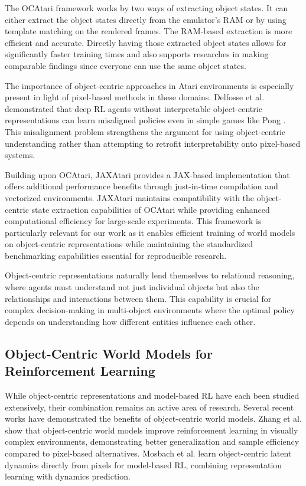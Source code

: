 \documentclass[
	english,
	ruledheaders=section,
	class=report,
	thesis={type=master},
	accentcolor=9c,
	custommargins=true,
	marginpar=false,
	parskip=half-,
	fontsize=11pt,
	pdfa=true,
]{tudapub}
\newcommand{\worldmodel}{world model}
\begin{document}
The OCAtari framework works by two ways of extracting object states. It can
either extract the object states directly from the emulator's RAM or by using
template matching on the rendered frames. The RAM-based extraction is more
efficient and accurate. Directly having those extracted object states allows
for significantly faster training times and also supports researches in making
comparable findings since everyone can use the same object states.

The importance of object-centric approaches in Atari environments is especially
present in light of pixel-based methods in these domains. Delfosse et al.
demonstrated that deep RL agents without interpretable object-centric
representations can learn misaligned policies even in simple games like Pong
\cite{DBLP:conf/rlc/DelfosseBGSK24}. This misalignment problem strengthens the argument
for using object-centric understanding rather than attempting to retrofit
interpretability onto pixel-based systems.

Building upon OCAtari, JAXAtari \cite{jaxatari} provides a
JAX-based implementation that offers additional performance benefits through
just-in-time compilation and vectorized environments. JAXAtari maintains
compatibility with the object-centric state extraction capabilities of OCAtari
while providing enhanced computational efficiency for large-scale experiments.
This framework is particularly relevant for our work as it enables efficient
training of \worldmodel{}s on object-centric representations while maintaining
the standardized benchmarking capabilities essential for reproducible research.

Object-centric representations naturally lend themselves to relational
reasoning, where agents must understand not just individual objects but also
the relationships and interactions between them. This capability is crucial for
complex decision-making in multi-object environments where the optimal policy
depends on understanding how different entities influence each other.

\subsection{Object-Centric World Models for Reinforcement Learning}

While object-centric representations and model-based RL have each been studied
extensively, their combination remains an active area of research. Several
recent works have demonstrated the benefits of object-centric world models.
Zhang et al. \cite{DBLP:journals/corr/abs-2501-16443} show that object-centric world models
improve reinforcement learning in visually complex environments, demonstrating
better generalization and sample efficiency compared to pixel-based
alternatives. Mosbach et al. \cite{DBLP:conf/icml/MosbachEVB25} learn object-centric
latent dynamics directly from pixels for model-based RL, combining
representation learning with dynamics prediction.
\end{document}
